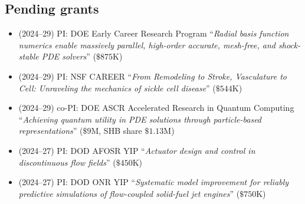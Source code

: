 \subsection{Pending grants}

\begin{itemize}
    \item (2024--29) PI: DOE Early Career Research Program ``\textit{Radial basis function numerics enable massively parallel, high-order accurate, mesh-free, and shock-stable PDE solvers}'' ($\$875$K)
    \item (2024--29) PI: NSF CAREER ``\textit{From Remodeling to Stroke, Vasculature to Cell: Unraveling the mechanics of sickle cell disease}'' ($\$544$K)
    \item (2024--29) co-PI: DOE ASCR Accelerated Research in Quantum Computing ``\textit{Achieving quantum utility in PDE solutions through particle-based representations}'' ($\$9$M, SHB share $\$1.13$M)
    \item (2024--27) PI: DOD AFOSR YIP ``\textit{Actuator design and control in discontinuous flow fields}'' ($\$450$K)
    \item (2024--27) PI: DOD ONR YIP ``\textit{Systematic model improvement for reliably predictive simulations of flow-coupled solid-fuel jet engines}'' ($\$750$K)
\end{itemize}
